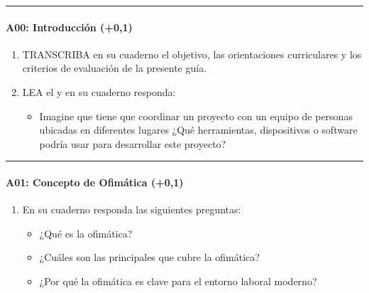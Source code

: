 \documentclass[letterpaper,10pt,spanish]{sphinxmanual}
\begin{document}
\bigskip\hrule\bigskip



\paragraph{A00: Introducción (+0,1)}
\label{\detokenize{cursos/ofimatica10/periodo01/G01:a00-introduccion-0-1}}
\sphinxAtStartPar
{}
\begin{enumerate}
%
\item {} 
\sphinxAtStartPar
TRANSCRIBA en su cuaderno el objetivo, las orientaciones curriculares y los criterios de evaluación de la presente guía.

\item {} 
\sphinxAtStartPar
LEA el  y en su cuaderno responda:
\begin{itemize}
\item {} 
\sphinxAtStartPar
Imagine que tiene que coordinar un proyecto con un equipo de personas ubicadas en diferentes lugares ¿Qué herramientas, dispositivos o software podría usar para desarrollar este proyecto?

\end{itemize}

\end{enumerate}


\bigskip\hrule\bigskip



\paragraph{A01: Concepto de Ofimática (+0,1)}
\label{\detokenize{cursos/ofimatica10/periodo01/G01:a01-concepto-de-ofimatica-0-1}}
\sphinxAtStartPar
{}
\begin{enumerate}
%
\item {} 
\sphinxAtStartPar
En su cuaderno responda las siguientes preguntas:
\begin{itemize}
\item {} 
\sphinxAtStartPar
¿Qué es la ofimática?

\item {} 
\sphinxAtStartPar
¿Cuáles son las principales  que cubre la ofimática?

\item {} 
\sphinxAtStartPar
¿Por qué la ofimática es clave para el entorno laboral moderno?

\end{itemize}

\end{enumerate}
\end{document}
